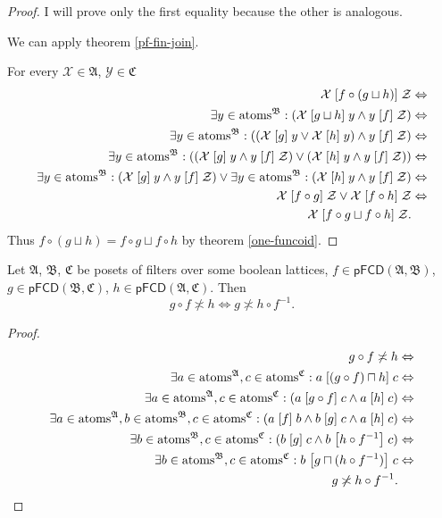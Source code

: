 \begin{proof}
I will prove only the first equality because the other is analogous.

We can apply theorem \ref{pf-fin-join}.

For every $\mathcal{X}\in\mathfrak{A}$, $\mathcal{Y}\in\mathfrak{C}$
\begin{align*}
\mathcal{X}\mathrel{\left[f\circ(g\sqcup h)\right]}\mathcal{Z} & \Leftrightarrow\\
\exists y\in\operatorname{atoms}^{\mathfrak{B}}:(\mathcal{X}\mathrel{\left[g\sqcup h\right]}y\land y\mathrel{\left[f\right]}\mathcal{Z}) & \Leftrightarrow\\
\exists y\in\operatorname{atoms}^{\mathfrak{B}}:((\mathcal{X}\mathrel{\left[g\right]}y\lor\mathcal{X}\mathrel{\left[h\right]}y)\land y\mathrel{\left[f\right]}\mathcal{Z}) & \Leftrightarrow\\
\exists y\in\operatorname{atoms}^{\mathfrak{B}}:((\mathcal{X}\mathrel{\left[g\right]}y\land y\mathrel{\left[f\right]}\mathcal{Z})\lor(\mathcal{X}\mathrel{\left[h\right]}y\land y\mathrel{\left[f\right]}\mathcal{Z})) & \Leftrightarrow\\
\exists y\in\operatorname{atoms}^{\mathfrak{B}}:(\mathcal{X}\mathrel{\left[g\right]}y\land y\mathrel{\left[f\right]}\mathcal{Z})\lor\exists y\in\operatorname{atoms}^{\mathfrak{B}}:(\mathcal{X}\mathrel{\left[h\right]}y\land y\mathrel{\left[f\right]}\mathcal{Z}) & \Leftrightarrow\\
\mathcal{X}\mathrel{\left[f\circ g\right]}\mathcal{Z}\lor\mathcal{X}\mathrel{\left[f\circ h\right]}\mathcal{Z} & \Leftrightarrow\\
\mathcal{X}\mathrel{\left[f\circ g\sqcup f\circ h\right]}\mathcal{Z}.
\end{align*}
Thus $f\circ(g\sqcup h)=f\circ g\sqcup f\circ h$ by theorem \ref{one-funcoid}.\end{proof}
\begin{thm}
\label{qi-bool}Let $\mathfrak{A}$, $\mathfrak{B}$, $\mathfrak{C}$
be posets of filters over some boolean lattices, $f\in\mathsf{pFCD}(\mathfrak{A},\mathfrak{B})$,
$g\in\mathsf{pFCD}(\mathfrak{B},\mathfrak{C})$, $h\in\mathsf{pFCD}(\mathfrak{A},\mathfrak{C})$.
Then 
\[
g\circ f\nasymp h\Leftrightarrow g\nasymp h\circ f^{-1}.
\]
\end{thm}
\begin{proof}
~
\begin{align*}
g\circ f\not\asymp h & \Leftrightarrow\\
\exists a\in\operatorname{atoms}^{\mathfrak{A}},c\in\operatorname{atoms}^{\mathfrak{C}}:a\mathrel{\left[(g\circ f)\sqcap h\right]}c & \Leftrightarrow\\
\exists a\in\operatorname{atoms}^{\mathfrak{A}},c\in\operatorname{atoms}^{\mathfrak{C}}:(a\mathrel{\left[g\circ f\right]}c\land a\mathrel{\left[h\right]}c) & \Leftrightarrow\\
\exists a\in\operatorname{atoms}^{\mathfrak{A}},b\in\operatorname{atoms}^{\mathfrak{B}},c\in\operatorname{atoms}^{\mathfrak{C}}:(a\mathrel{\left[f\right]}b\land b\mathrel{\left[g\right]}c\land a\mathrel{\left[h\right]}c) & \Leftrightarrow\\
\exists b\in\operatorname{atoms}^{\mathfrak{B}},c\in\operatorname{atoms}^{\mathfrak{C}}:(b\mathrel{\left[g\right]}c\land b\mathrel{\left[h\circ f^{-1}\right]}c) & \Leftrightarrow\\
\exists b\in\operatorname{atoms}^{\mathfrak{B}},c\in\operatorname{atoms}^{\mathfrak{C}}:b\mathrel{\left[g\sqcap(h\circ f^{-1})\right]}c & \Leftrightarrow\\
g\not\asymp h\circ f^{-1}.
\end{align*}

\end{proof}

